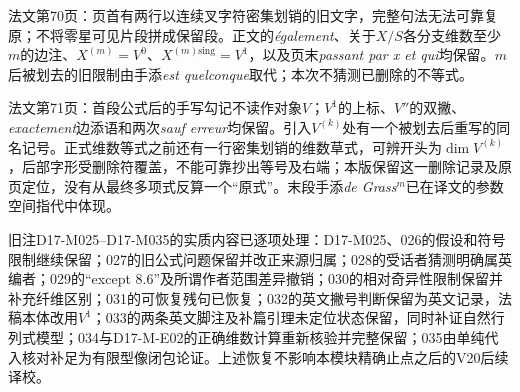 法文第70页：页首有两行以连续叉字符密集划销的旧文字，完整句法无法可靠复原；不将零星可见片段拼成保留段。正文的\emph{également}、关于$X/S$各分支维数至少$m$的边注、$X^{(m)}=V^0$、$X^{(m)\mathrm{sing}}=V^1$，以及页末\emph{passant par x et qui}均保留。$m$后被划去的旧限制由手添\emph{est quelconque}取代；本次不猜测已删除的不等式。

法文第71页：首段公式后的手写勾记不读作对象$V$；$V^1$的上标、$V''$的双撇、\emph{exactement}边添语和两次\emph{sauf erreur}均保留。引入$V^{(k)}$处有一个被划去后重写的同名记号。正式维数等式之前还有一行密集划销的维数草式，可辨开头为$\dim V^{(k)}$，后部字形受删除符覆盖，不能可靠抄出等号及右端；本版保留这一删除记录及原页定位，没有从最终多项式反算一个“原式”。末段手添\emph{de Grass}$^m$已在译文的参数空间指代中体现。

旧注D17-M025--D17-M035的实质内容已逐项处理：D17-M025、026的假设和符号限制继续保留；027的旧公式问题保留并改正来源归属；028的受话者猜测明确属英编者；029的“except 8.6”及所谓作者范围差异撤销；030的相对奇异性限制保留并补充纤维区别；031的可恢复残句已恢复；032的英文撇号判断保留为英文记录，法稿本体改用$V^1$；033的两条英文脚注及补篇引理未定位状态保留，同时补证自然行列式模型；034与D17-M-E02的正确维数计算重新核验并完整保留；035由单纯代入核对补足为有限型像闭包论证。上述恢复不影响本模块精确止点之后的V20后续译校。
